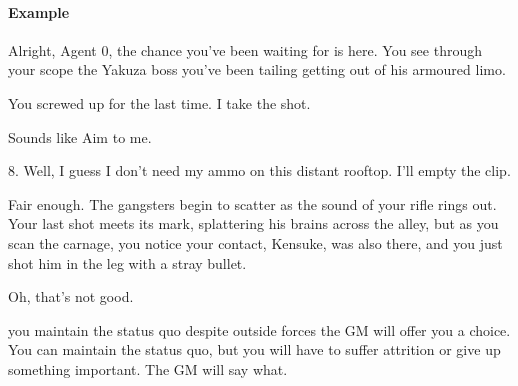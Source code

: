 \paragraph{Example}
\begin{dialogue}
   Alright, Agent 0, the chance you've been waiting for is
  here. You see through your scope the Yakuza boss you've been tailing
  getting out of his armoured limo.

   You screwed up for the last time. I take the shot.

   Sounds like Aim to me.

   8. Well, I guess I don't need my ammo on this
  distant rooftop. I'll empty the clip.

   Fair enough. The gangsters begin to scatter as the sound
  of your rifle rings out. Your last shot meets its mark, splattering
  his brains across the alley, but as you scan the carnage, you notice
  your contact, Kensuke, was also there, and you just shot him in the
  leg with a stray bullet.

   Oh, that's not good.
\end{dialogue}

{you maintain the status quo despite outside forces}
{the GM will offer you a choice. You can maintain the status quo, but you will have to suffer attrition or give up something important. The GM will say what.}





